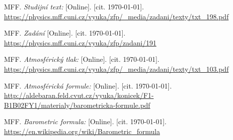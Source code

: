
\begin{thebibliography}{9}
 MFF. \emph{Studijní text:} [Online]. [cit. \today]. \newline \url{https://physics.mff.cuni.cz/vyuka/zfp/_media/zadani/texty/txt_198.pdf}

 MFF. \emph{Zadání} [Online]. [cit. \today]. \newline \url{https://physics.mff.cuni.cz/vyuka/zfp/zadani/191}

 MFF. \emph{Atmosférický tlak:} [Online]. [cit. \today]. \newline \url{https://physics.mff.cuni.cz/vyuka/zfp/_media/zadani/texty/txt_103.pdf}

 MFF. \emph{Atmosférická formule:} [Online]. [cit. \today]. \newline \url{http://aldebaran.feld.cvut.cz/vyuka/konicek/F1-B1B02FY1/materialy/barometricka-formule.pdf}

 MFF. \emph{Barometric formula:} [Online]. [cit. \today]. \newline \url{https://en.wikipedia.org/wiki/Barometric_formula}

\end{thebibliography}
